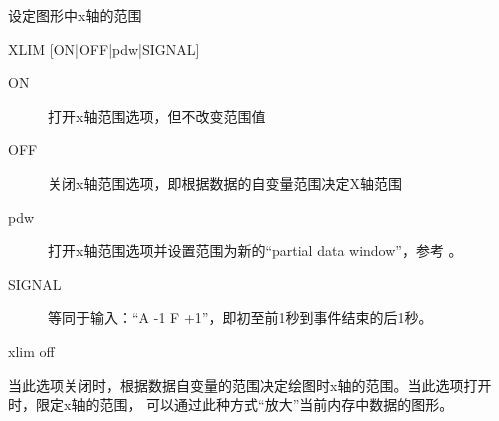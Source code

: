 \label{cmd:xlim}

设定图形中x轴的范围

\begin{SACSTX}
XLIM [ON|OFF|pdw|SIGNAL]
\end{SACSTX}

\begin{description}
\item [ON] 打开x轴范围选项，但不改变范围值
\item [OFF] 关闭x轴范围选项，即根据数据的自变量范围决定X轴范围
\item [pdw] 打开x轴范围选项并设置范围为新的``partial data window''，参考 。
\item [SIGNAL] 等同于输入：``A -1 F +1''，即初至前1秒到事件结束的后1秒。
\end{description}

\begin{SACDFT}
xlim off
\end{SACDFT}

当此选项关闭时，根据数据自变量的范围决定绘图时x轴的范围。当此选项打开时，限定x轴的范围，
可以通过此种方式``放大''当前内存中数据的图形。

